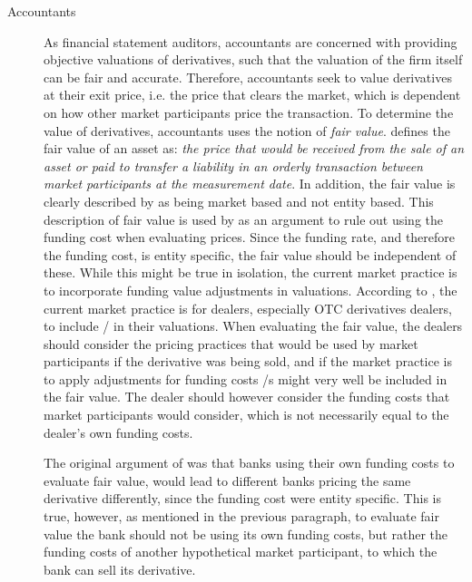 \documentclass[../../../main.tex]{subfiles}
\begin{document}
\begin{description}
            \item[Accountants]
            As financial statement auditors, accountants are concerned with providing objective valuations of derivatives,
            such that the valuation of the firm itself can be fair and accurate.
            Therefore, accountants seek to value derivatives at their exit price, i.e. the price that clears the market,
            which is dependent on how other market participants price the transaction.
            To determine the value of derivatives, accountants uses the notion of \textit{fair value}.
            \cite{IFRS13} defines the fair value of an asset as: \textit{the price that would be received from the sale of an asset or paid to transfer a liability in an orderly transaction between market participants at the measurement date}.
            In addition, the fair value is clearly described by \cite{IFRS13} as being market based and not entity based.
            This description of fair value is used by \cite{HullWhiteFVA} as an argument to
            rule out using the funding cost when evaluating prices.
            Since the funding rate, and therefore the funding cost, is entity specific,
            the fair value should be independent of these.
            While this might be true in isolation, 
            the current market practice is to incorporate funding value adjustments in valuations.
            According to \cite{EY}, the current market practice is for dealers, especially OTC derivatives dealers,
            to include \FVA/ in their valuations.
            When evaluating the fair value, the dealers should consider the pricing practices 
            that would be used by market participants if the derivative was being sold,
            and if the market practice is to apply adjustments for funding costs
            \FVA/s might very well be included in the fair value.
            The dealer should however consider the funding costs that market participants would consider,
            which is not necessarily equal to the dealer's own funding costs.

            The original argument of \cite{HullWhiteFVA} was that banks using their own funding costs to evaluate fair value,
            would lead to different banks pricing the same derivative differently,
            since the funding cost were entity specific.
            This is true, however, as mentioned in the previous paragraph,
            to evaluate fair value the bank should not be using its own funding costs, 
            but rather the funding costs of another hypothetical market participant, 
            to which the bank can sell its derivative.


\end{description}
\end{document}
